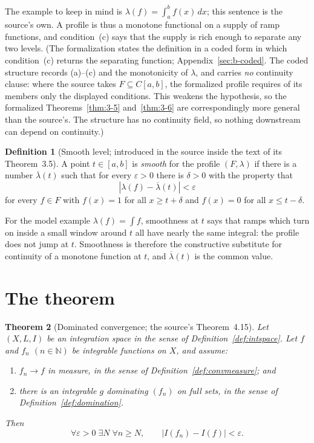 \documentclass[11pt]{article}
\newtheorem{theorem}{Theorem}[section]
\theoremstyle{definition}
\newtheorem{definition}[theorem]{Definition}
\theoremstyle{remark}
\begin{document}
The example to keep in mind is $\lambda(f)=\int_a^b f(x)\,dx$; this sentence is the source's own.  A profile is thus a monotone functional on a supply of ramp functions, and condition~(c) says that the supply is rich enough to separate any two levels.  (The formalization states the definition in a coded form in which condition~(c) returns the separating function; Appendix~\ref{sec:b-coded}.  The coded structure records (a)--(c) and the monotonicity of $\lambda$, and carries \emph{no} continuity clause: where the source takes $F\subseteq C[a,b]$, the formalized profile requires of its members only the displayed conditions.  This weakens the hypothesis, so the formalized Theorems~\ref{thm:3-5} and~\ref{thm:3-6} are correspondingly more general than the source's.  The structure has no continuity field, so nothing downstream can depend on continuity.)

\begin{definition}[Smooth level; introduced in the source inside the text of its Theorem~3.5]
\label{def:smooth}
A point $t\in[a,b]$ is \emph{smooth} for the profile $(F,\lambda)$ if there is a number $\overline{\lambda}(t)$ such that for every $\varepsilon>0$ there is $\delta>0$ with the property that
\[
|\lambda(f)-\overline{\lambda}(t)|<\varepsilon
\]
for every $f\in F$ with $f(x)=1$ for all $x\ge t+\delta$ and $f(x)=0$ for all $x\le t-\delta$.
\end{definition}

For the model example $\lambda(f)=\int f$, smoothness at $t$ says that ramps which turn on inside a small window around $t$ all have nearly the same integral: the profile does not jump at $t$.  Smoothness is therefore the constructive substitute for continuity of a monotone function at $t$, and $\overline{\lambda}(t)$ is the common value.

\section{The theorem}
\label{sec:main-result}

\begin{theorem}[Dominated convergence; the source's Theorem~4.15]
\label{thm:prop-dct}
Let $(X,L,I)$ be an integration space in the sense of Definition~\ref{def:intspace}.  Let $f$ and $f_n$ $(n\in\mathbb{N})$ be integrable functions on $X$, and assume:
\begin{enumerate}[label=(\roman*)]
\item $f_n\to f$ in measure, in the sense of Definition~\ref{def:convmeasure}; and
\item there is an integrable $g$ dominating $(f_n)$ on full sets, in the sense of Definition~\ref{def:domination}.
\end{enumerate}
Then
\[
  \forall \varepsilon>0\;\exists N\;\forall n\geq N,
  \qquad |I(f_n)-I(f)|<\varepsilon.
\]
\end{theorem}
\end{document}
